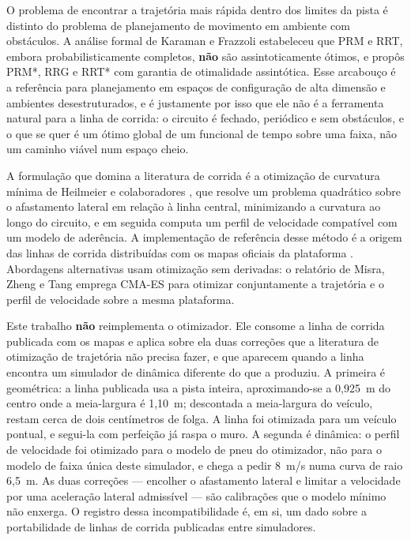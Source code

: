 O problema de encontrar a trajetória mais rápida dentro dos limites da pista é
distinto do problema de planejamento de movimento em ambiente com obstáculos. A
análise formal de Karaman e Frazzoli \cite{Karaman2011Optimal} estabeleceu que
PRM e RRT, embora probabilisticamente completos, \textbf{não} são
assintoticamente ótimos, e propôs PRM*, RRG e RRT* com garantia de otimalidade
assintótica. Esse arcabouço é a referência para planejamento em espaços de
configuração de alta dimensão e ambientes desestruturados, e é justamente por
isso que ele não é a ferramenta natural para a linha de corrida: o circuito é
fechado, periódico e sem obstáculos, e o que se quer é um ótimo global de um
funcional de tempo sobre uma faixa, não um caminho viável num espaço cheio.

A formulação que domina a literatura de corrida é a otimização de curvatura
mínima de Heilmeier e colaboradores \cite{Heilmeier2020MinCurv}, que resolve um
problema quadrático sobre o afastamento lateral em relação à linha central,
minimizando a curvatura ao longo do circuito, e em seguida computa um perfil de
velocidade compatível com um modelo de aderência. A implementação de referência
desse método \cite{TUMFTMRaceTrajectory} é a origem das linhas de corrida
distribuídas com os mapas oficiais da plataforma \cite{F1TENTHRaceTracks}.
Abordagens alternativas usam otimização sem derivadas: o relatório de Misra,
Zheng e Tang \cite{Misra2024Report} emprega CMA-ES para otimizar conjuntamente
a trajetória e o perfil de velocidade sobre a mesma plataforma.

Este trabalho \textbf{não} reimplementa o otimizador. Ele consome a linha de
corrida publicada com os mapas e aplica sobre ela duas correções que a
literatura de otimização de trajetória não precisa fazer, e que aparecem quando
a linha encontra um simulador de dinâmica diferente do que a produziu. A
primeira é geométrica: a linha publicada usa a pista inteira, aproximando-se a
0,925~m do centro onde a meia-largura é 1,10~m; descontada a meia-largura do
veículo, restam cerca de dois centímetros de folga. A linha foi otimizada para
um veículo pontual, e segui-la com perfeição já raspa o muro. A segunda é
dinâmica: o perfil de velocidade foi otimizado para o modelo de pneu do
otimizador, não para o modelo de faixa única deste simulador, e chega a pedir
8~m/s numa curva de raio 6,5~m. As duas correções --- encolher o afastamento
lateral e limitar a velocidade por uma aceleração lateral admissível --- são
calibrações que o modelo mínimo não enxerga. O registro dessa incompatibilidade
é, em si, um dado sobre a portabilidade de linhas de corrida publicadas entre
simuladores.

